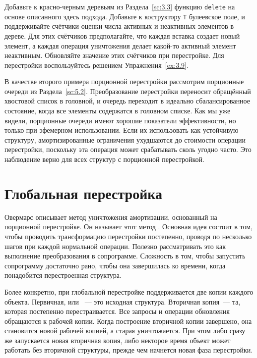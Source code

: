 \begin{exercise}\label{ex:8.1}
  Добавьте к красно-черным деревьям из Раздела~\ref{sc:3.3} функцию
  \lstinline!delete! на основе описанного здесь подхода. Добавьте к
  коструктору \lstinline!T! булеевское поле, и поддерживайте
  счётчики-оценки числа
  активных и неактивных элементов в дереве. Для этих счётчиков
  предполагайте, что каждая вставка создает новый элемент, а каждая
  операция уничтожения делает какой-то активный элемент
  неактивным. Обновляйте значение этих счётчиков при перестройке.  Для
  перестройки воспользуйтесь решением Упражнения~\ref{ex:3.9}.
\end{exercise}

В качестве второго примера порционной перестройки рассмотрим
порционные очереди из Раздела~\ref{sc:5.2}. Преобразование перестройки
переносит обращённый хвостовой список в головной, и очередь переходит
в идеально сбалансированное состояние, когда все элементы содержатся в
головном списке.  Как мы уже видели, порционные очереди имеют хорошие
показатели эффективности, но только при эфемерном использовании. Если
их использовать как устойчивую структуру, амортизированные ограничения
ухудшаются до стоимости операции перестройки, поскольку эта операция
может срабатывать сколь угодно часто. Это наблюдение верно для всех
структур с порционной перестройкой.

\section{Глобальная перестройка}
\label{sc:8.2}

Овермарс \cite{Overmars183} описывает метод уничтожения амортизации,
основанный на порционной перестройке. Он называет этот метод
. Основная идея
состоит в том, чтобы проводить трансформацию перестройки постепенно,
проводя по несколько шагов при каждой нормальной операции. Полезно
рассматривать это как выполнение преобразования в
сопрограмме. Сложность в том, чтобы запустить сопрограмму достаточно
рано, чтобы она завершилась ко времени, когда понадобится
перестроенная структура.

Более конкретно, при глобальной перестройке поддерживается две копии
каждого объекта. Первичная, или ~--- это
исходная структура. Вторичная копия~--- та, которая постепенно
перестраивается. Все запросы и операции обновления обращаются к рабочей
копии. Когда построение вторичной копии завершено, она становится
новой рабочей копией, а старая уничтожается. При этом либо сразу же
запускается новая вторичная копия, либо некторое время объект может
работать без вторичной структуры, прежде чем начнется новая фаза
перестройки.


